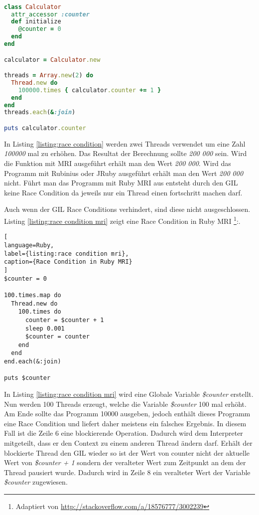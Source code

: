 \begin{lstlisting}[language=Ruby,label={listing:race condition}]

class Calculator
  attr_accessor :counter
  def initialize
    @counter = 0
  end
end

calculator = Calculator.new

threads = Array.new(2) do
  Thread.new do
    100000.times { calculator.counter += 1 }
  end
end
threads.each(&:join)

puts calculator.counter

\end{lstlisting}

In Listing \ref{listing:race condition} werden zwei Threads verwendet um eine Zahl \emph{100000} mal zu erhöhen. Das Resultat der Berechnung sollte \emph{200 000} sein. Wird die Funktion mit MRI ausgeführt erhält man den Wert \emph{200 000}. Wird das Programm mit Rubinius oder JRuby ausgeführt erhält man den Wert \emph{200 000} nicht. Führt man das Programm mit Ruby MRI aus entsteht durch den GIL keine Race Condition da jeweils nur ein Thread einen fortschritt machen darf.

Auch wenn der GIL Race Conditions verhindert, sind diese nicht ausgeschlossen. Listing \ref{listing:race condition mri} zeigt eine Race Condition in Ruby MRI \footnote{Adaptiert von \url{http://stackoverflow.com/a/18576777/3002239}}:.

\begin{lstlisting}[
language=Ruby,
label={listing:race condition mri},
caption={Race Condition in Ruby MRI}
]
$counter = 0

100.times.map do
  Thread.new do
    100.times do
      counter = $counter + 1
      sleep 0.001
      $counter = counter
    end
  end
end.each(&:join)

puts $counter 

\end{lstlisting}

In Listing \ref{listing:race condition mri} wird eine Globale Variable \emph{\$counter} erstellt. Nun werden 100 Threads erzeugt, welche die Variable \emph{\$counter} 100 mal erhöht. Am Ende sollte das Programm 10000 ausgeben, jedoch enthält dieses Programm eine Race Condition und liefert daher meistens ein falsches Ergebnis. In diesem Fall ist die Zeile 6 eine blockierende Operation. Dadurch wird dem Interpreter mitgeteilt, dass er den Context zu einem anderen Thread ändern darf. Erhält der blockierte Thread den GIL wieder so ist der Wert von counter nicht der aktuelle Wert von  \emph{\$counter + 1} sondern der veralteter Wert zum Zeitpunkt an dem der Thread pausiert wurde. Dadurch wird in Zeile 8 ein veralteter Wert der Variable \emph{\$counter} zugewiesen. 


